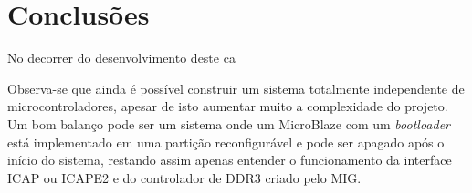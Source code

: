 ﻿%
                      

\chapter{Conclus\~{o}es}\label{CapConclusoes}

No decorrer do desenvolvimento deste ca

Observa-se que ainda é possível construir um sistema totalmente independente de microcontroladores, apesar de isto aumentar muito a complexidade do projeto.
Um bom balanço pode ser um sistema onde um MicroBlaze com um \textit{bootloader} está implementado em uma partição reconfigurável e pode ser apagado após o início do sistema, restando assim apenas entender o funcionamento da interface ICAP ou ICAPE2 e do controlador de DDR3 criado pelo MIG.
